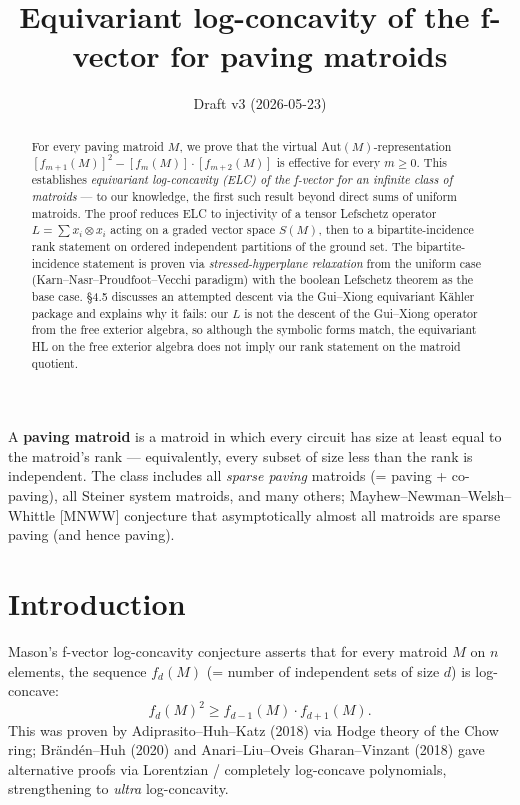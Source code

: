 \documentclass[11pt]{article}
\title{Equivariant log-concavity of the f-vector for paving matroids}
\author{}
\date{Draft v3 (2026-05-23)}
\theoremstyle{definition}
\newcommand{\Aut}{\mathrm{Aut}}
\begin{document}
\maketitle

\begin{abstract}
For every paving matroid $M$, we prove that the virtual $\Aut(M)$-representation $[f_{m+1}(M)]^2 - [f_m(M)] \cdot [f_{m+2}(M)]$ is effective for every $m \geq 0$. This establishes \emph{equivariant log-concavity (ELC) of the f-vector for an infinite class of matroids} --- to our knowledge, the first such result beyond direct sums of uniform matroids. The proof reduces ELC to injectivity of a tensor Lefschetz operator $L = \sum x_i \otimes x_i$ acting on a graded vector space $S(M)$, then to a bipartite-incidence rank statement on ordered independent partitions of the ground set. The bipartite-incidence statement is proven via \emph{stressed-hyperplane relaxation} from the uniform case (Karn--Nasr--Proudfoot--Vecchi paradigm) with the boolean Lefschetz theorem as the base case. \S4.5 discusses an attempted descent via the Gui--Xiong equivariant K\"ahler package and explains why it fails: our $L$ is not the descent of the Gui--Xiong operator from the free exterior algebra, so although the symbolic forms match, the equivariant HL on the free exterior algebra does not imply our rank statement on the matroid quotient.
\end{abstract}

A \textbf{paving matroid} is a matroid in which every circuit has size at least equal to the matroid's rank --- equivalently, every subset of size less than the rank is independent. The class includes all \emph{sparse paving} matroids (= paving + co-paving), all Steiner system matroids, and many others; Mayhew--Newman--Welsh--Whittle [MNWW] conjecture that asymptotically almost all matroids are sparse paving (and hence paving).

\section{Introduction}

Mason's f-vector log-concavity conjecture asserts that for every matroid $M$ on $n$ elements, the sequence $f_d(M)$ (= number of independent sets of size $d$) is log-concave:
\[ f_d(M)^2 \geq f_{d-1}(M) \cdot f_{d+1}(M). \]
This was proven by Adiprasito--Huh--Katz (2018) via Hodge theory of the Chow ring; Br\"and\'en--Huh (2020) and Anari--Liu--Oveis Gharan--Vinzant (2018) gave alternative proofs via Lorentzian / completely log-concave polynomials, strengthening to \emph{ultra} log-concavity.
\end{document}
